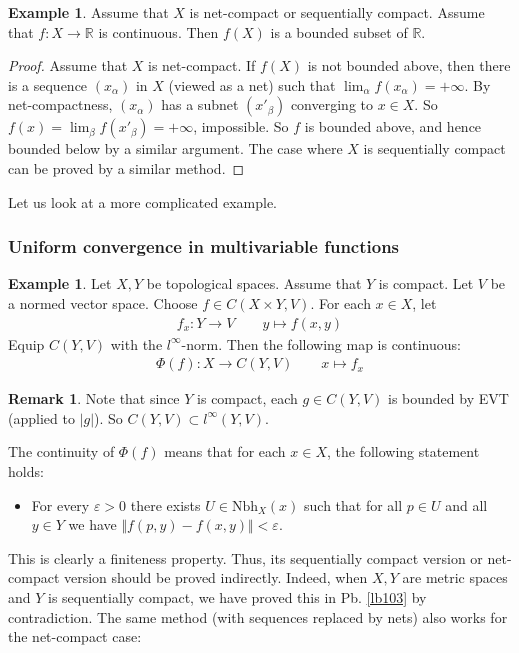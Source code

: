 \documentclass[12pt,b5paper,notitlepage]{article}
\theoremstyle{definition}
\newtheorem{eg}[df]{Example}
\newtheorem{rem}[df]{Remark}
\theoremstyle{plain}
\newcommand{\Rbb}{\mathbb R}
\newcommand{\Nbh}{\mathrm{Nbh}}
\newcommand{\eps}{\varepsilon}
\numberwithin{equation}{section}
\begin{document}
\begin{eg}
Assume that $X$ is net-compact or sequentially compact. Assume that $f:X\rightarrow\Rbb$ is continuous. Then $f(X)$ is a bounded subset of $\Rbb$.
\end{eg}


\begin{proof}
Assume that $X$ is net-compact. If $f(X)$ is not bounded above, then there is a sequence $(x_\alpha)$ in $X$ (viewed as a net)  such that $\lim_\alpha f(x_\alpha)=+\infty$. By net-compactness, $(x_\alpha)$ has a subnet $(x'_\beta)$ converging to $x\in X$. So $f(x)=\lim_\beta f(x'_\beta)=+\infty$, impossible. So $f$ is bounded above, and hence bounded below by a similar argument. The case where $X$ is sequentially compact can be proved by a similar method.
\end{proof}




Let us look at a more complicated example.













\subsubsection{Uniform convergence in multivariable functions}\label{lb271}


\begin{eg}\label{lb225}
Let $X,Y$ be topological spaces. Assume that $Y$ is compact. Let $V$ be a normed vector space. Choose $f\in C(X\times Y,V)$. For each $x\in X$, let
\begin{align*}
f_x:Y\rightarrow V\qquad y\mapsto f(x,y)
\end{align*}
Equip $C(Y,V)$ with the $l^\infty$-norm. Then the following map is continuous:
\begin{align}
\Phi(f):X\rightarrow C(Y,V)\qquad x\mapsto f_x
\end{align}
\end{eg}



\begin{rem}
Note that since $Y$ is compact, each $g\in C(Y,V)$ is bounded by EVT (applied to $|g|$). So $C(Y,V)\subset l^\infty(Y,V)$.
\end{rem}


The continuity of $\Phi(f)$ means that for each $x\in X$, the following statement holds:
\begin{itemize}
\item[\textleaf] For every $\eps>0$ there exists $U\in\Nbh_X(x)$ such that for all $p\in U$ and all $y\in Y$ we have $\Vert f(p,y)-f(x,y)\Vert<\eps$.
\end{itemize}
This is clearly a finiteness property. Thus, its sequentially compact version or net-compact version should be proved indirectly. Indeed, when $X,Y$ are metric spaces and $Y$ is sequentially compact, we have proved this in Pb. \ref{lb103} by contradiction. The same method (with sequences replaced by nets) also works for the net-compact case:
\end{document}

